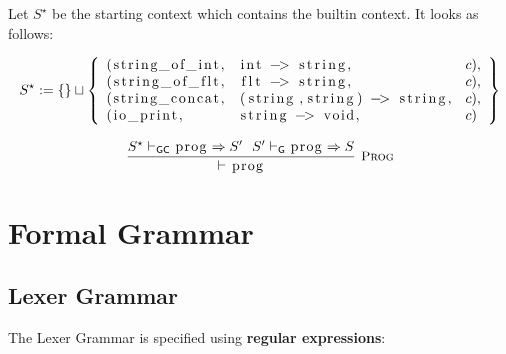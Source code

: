 \documentclass{article}
\newcommand{\code}[1]{\lstinline[columns=fixed]{#1}}
\newcommand{\drmrule}[5]{\frac{#1}{#2\vdash_{\mathsf{#3}}#4}\textsc{\ \small{#5}}}
\newcommand{\ruleapp}[1]{\vdash_{\mathsf{#1}}}
\newcommand{\mc}[1]{\textnormal{\code{#1}}}
\begin{document}
			Let $S^\star$ be the starting context which contains the builtin context. It looks as follows:
			
			\begin{align*}
				S^\star := \{\}\sqcup \left\{
					\begin{array}{lll}
						(\mc{string\_of\_int},&\mc{int -> string},&c),\\ (\mc{string\_of\_flt},&\mc{flt -> string},&c),\\
						(\mc{string\_concat},&\mc{(string,string) -> string},&c),\\
						(\mc{io\_print},&\mc{string -> void},&c)
					\end{array}
				\right\}
			\end{align*}
		
			\begin{align*}
				\drmrule{S^\star \ruleapp{GC} \mc{prog} \Rightarrow S' \ \ S' \ruleapp{G} \mc{prog} \Rightarrow S}{}{}{\mc{prog}}{Prog}
			\end{align*}
		
	\section{Formal Grammar}
	
		\subsection{Lexer Grammar}
		
			The Lexer Grammar is specified using \textbf{regular expressions}:
			
\end{document}
